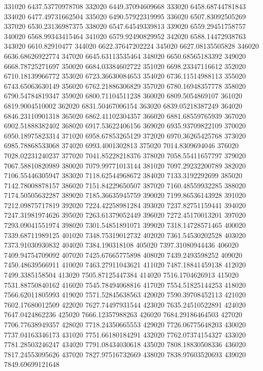 {331020 6437.53770978708
332020 6449.37094609668
333020 6458.68744781843
334020 6477.49731662504
335020 6490.57922319995
336020 6507.83092505269
337020 6530.23136987375
338020 6547.64549339813
339020 6559.29451758757
340020 6568.99343415464
341020 6579.92490829952
342020 6588.14472938763
343020 6610.82910477
344020 6622.37647202224
345020 6627.08135505828
346020 6636.68626922774
347020 6645.63113535464
348020 6650.68565183392
349020 6668.78725271697
350020 6684.03384602722
351020 6698.23347116612
352020 6710.18139966772
353020 6723.36630084653
354020 6736.11514988113
355020 6743.65063630149
356020 6762.21886306829
357020 6780.16948357778
358020 6790.54784819347
359020 6800.71104511238
360020 6809.5054869107
361020 6819.9004510002
362020 6831.50467006154
363020 6839.05218387249
364020 6846.23110901318
365020 6862.41102304357
366020 6881.68559765939
367020 6902.51888382402
368020 6917.53622406156
369020 6935.93709822109
370020 6950.18975823314
371020 6958.67853265129
372020 6970.36265425768
373020 6985.78868533068
374020 6993.4001302813
375020 7014.8309694046
376020 7028.02231240237
377020 7041.85228218376
378020 7058.55411657797
379020 7067.58810820989
380020 7079.99771013144
381020 7097.29232200789
382020 7106.55446305947
383020 7118.62544968672
384020 7133.3192292699
385020 7142.78008878157
386020 7151.84229650507
387020 7160.48559932285
388020 7174.50505632287
389020 7185.36635945759
390020 7199.86536143928
391020 7212.09875717819
392020 7224.42258981284
393020 7237.82751159441
394020 7247.31981974626
395020 7263.61379052449
396020 7272.45170013201
397020 7293.09041551974
398020 7301.54851891071
399020 7318.14728571465
400020 7339.68711989125
401020 7348.75319012732
402020 7361.54530202528
403020 7373.91030930832
404020 7384.190318108
405020 7397.31080944436
406020 7409.94754709092
407020 7425.67665775898
408020 7439.2493598252
409020 7450.48639566911
410020 7463.27911043621
411020 7487.18841459138
412020 7499.3385158504
413020 7505.87125447384
414020 7516.1704626913
415020 7531.88750840162
416020 7545.78494068816
417020 7554.51825144253
418020 7566.62011805993
419020 7571.52845638563
420020 7590.39708452113
421020 7602.17680012509
422020 7627.74497931544
423020 7635.24510522891
424020 7647.0424862236
425020 7666.12357988263
426020 7684.29186464503
427020 7706.77638949357
428020 7718.24350665553
429020 7726.06775648203
430020 7737.04163346173
431020 7751.66180184291
432020 7762.07374154327
433020 7781.28503246247
434020 7791.08434030618
435020 7808.18830508336
436020 7817.24553095626
437020 7827.97516732669
438020 7838.97603520693
439020 7849.69699121648
}
